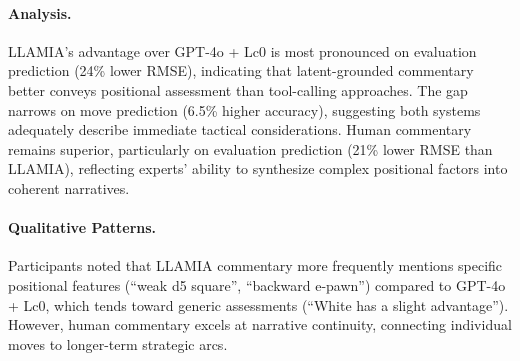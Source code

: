 \paragraph{Analysis.}
LLAMIA's advantage over GPT-4o + Lc0 is most pronounced on evaluation prediction (24\% lower RMSE), indicating that latent-grounded commentary better conveys positional assessment than tool-calling approaches. The gap narrows on move prediction (6.5\% higher accuracy), suggesting both systems adequately describe immediate tactical considerations. Human commentary remains superior, particularly on evaluation prediction (21\% lower RMSE than LLAMIA), reflecting experts' ability to synthesize complex positional factors into coherent narratives.

\paragraph{Qualitative Patterns.}
Participants noted that LLAMIA commentary more frequently mentions specific positional features (``weak d5 square'', ``backward e-pawn'') compared to GPT-4o + Lc0, which tends toward generic assessments (``White has a slight advantage''). However, human commentary excels at narrative continuity, connecting individual moves to longer-term strategic arcs.